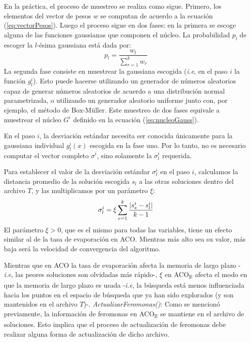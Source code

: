 \documentclass{llncs}
\DeclarePairedDelimiter\abs{\lvert}{\rvert}
\begin{document}
	En la práctica, el proceso de muestreo se realiza como sigue. Primero, los elementos del vector de pesos $w$ se computan de
	acuerdo a la ecuación (\ref{eq:vectorPesos}). Luego el proceso sigue en dos fases: en la primera se escoge alguna de las funciones
	gaussianas que componen el núcleo. La probabilidad $p_l$ de escoger la $l$-ésima gaussiana está dada por:
	\begin{equation*}
	p_l = \frac{w_l}{\sum_{r=1}^{k}w_r}
	\end{equation*}
	La segunda fase consiste en muestrear la gaussiana escogida (\textit{i.e}, en el paso $i$ la función $g_l^i$). Esto puede hacerse
	utilizando un generador de números aleatorios capaz de generar números aleatorios de acuerdo a una distribución normal
	parametrizada, o utilizando un generador aleatorio uniforme junto con, por ejemplo, el método de Box-Müller. Este muestreo de dos
	fases equivale a muestrear el núcleo $G^i$ definido en la ecuación (\ref{eq:nucleoGauss}).
	
	En el paso $i$, la desviación estándar necesita ser conocida únicamente para la gaussiana individual $g_l^i(x)$ escogida en la fase
	uno. Por lo tanto, no es necesario computar el vector completo $\sigma^i$, sino solamente la $\sigma^i_l$ requerida.
		
	Para establecer el valor de la desviación estándar $\sigma^i_l$ en el paso $i$, calculamos la distancia promedio de la solución
	escogida $s_l$ a las otras soluciones dentro del archivo $T$, y las multiplicamos por un parámetro $\xi$:
	\begin{equation*}
	\sigma^i_l = \xi \sum_{e=1}^{k}\frac{\abs{s^i_e - s^i_l}}{k-1}
	\end{equation*}
	El parámetro $\xi > 0$, que es el mismo para todas las variables, tiene un efecto similar al de la tasa 
	de evaporación en ACO. Mientras más alto sea su valor, más baja será la velocidad de convergencia del algoritmo.
	 
	Mientras que en ACO la tasa de evaporación afecta la memoria de largo plazo -\textit{i.e}, las peores soluciones son olvidadas más rápido-, $\xi$ en ACO\textsubscript{$\mathbb{R}$} afecta el modo en que la memoria de largo plazo es usada -\textit{i.e}, la búsqueda está menos influenciada hacia los puntos en el espacio de búsqueda que ya han sido explorados (y son mantenidos en el archivo $T$)-.
	\bigbreak	
	\textit{ActualizarFeromonas()}: Como se mencionó previamente, la información de feromonas en ACO\textsubscript{$\mathbb{R}$} se mantiene
	en el archivo de soluciones. Esto implica que el proceso de actualización de feromonas debe realizar alguna forma de actualización
	de dicho archivo.
	
\end{document}
